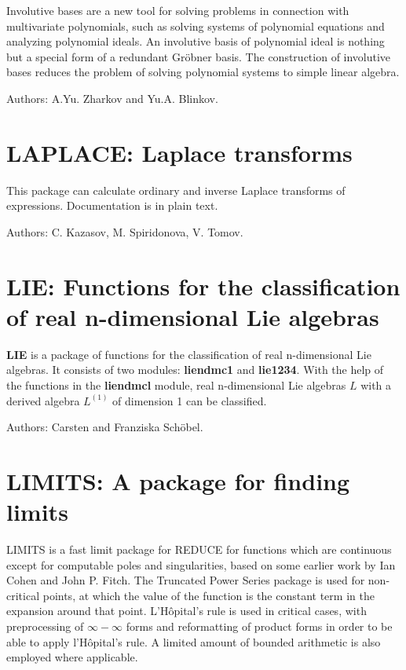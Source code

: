 Involutive bases are a new tool for solving problems in connection with
multivariate polynomials, such as solving systems of polynomial equations
and analyzing polynomial ideals.  An involutive basis of polynomial ideal
is nothing but a special form of a redundant Gr\"obner basis.  The
construction of involutive bases reduces the problem of solving polynomial
systems to simple linear algebra.

Authors: A.Yu. Zharkov and Yu.A. Blinkov.

\section{LAPLACE: Laplace transforms} 

This package can calculate ordinary and inverse Laplace transforms of
expressions.  Documentation is in plain text.

Authors: C. Kazasov, M. Spiridonova, V. Tomov.

\section{LIE: Functions for the classification of real n-dimensional Lie
algebras}

{\bf LIE} is a package of functions for the classification of real
n-dimensional Lie algebras.  It consists of two modules: {\bf liendmc1}
and {\bf lie1234}.  With the help of the functions in the {\bf liendmcl}
module, real n-dimensional Lie algebras $L$ with a derived algebra
$L^{(1)}$ of dimension 1 can be classified.

Authors: Carsten and Franziska Sch\"obel.

\section{LIMITS: A package for finding limits} 

LIMITS is a fast limit package for REDUCE for functions which are
continuous except for computable poles and singularities, based on some
earlier work by Ian Cohen and John P. Fitch.  The Truncated Power Series
package is used for non-critical points, at which the value of the
function is the constant term in the expansion around that point.
L'H\^opital's rule is used in critical cases, with preprocessing of
$\infty - \infty$ forms and reformatting of product forms in order to
be able to apply l'H\^opital's rule.  A limited amount of bounded arithmetic
is also employed where applicable.

